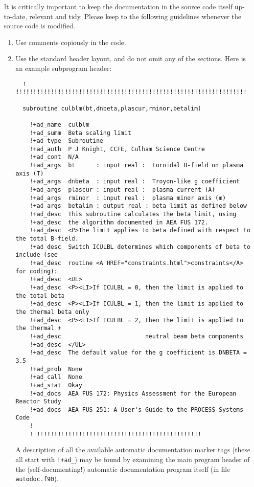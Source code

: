 \documentclass[11pt,a4paper]{report}
\begin{document}
It is critically important to keep the documentation in the source code itself
up-to-date, relevant and tidy. Please keep to the following guidelines
whenever the source code is modified.
\begin{enumerate}

\item Use comments copiously in the code.

\item Use the standard header layout, and do not omit any of the
  sections. Here is an example subprogram header:
\footnotesize
\begin{verbatim}
  ! !!!!!!!!!!!!!!!!!!!!!!!!!!!!!!!!!!!!!!!!!!!!!!!!!!!!!!!!!!!!!!!!!!

  subroutine culblm(bt,dnbeta,plascur,rminor,betalim)

    !+ad_name  culblm
    !+ad_summ  Beta scaling limit
    !+ad_type  Subroutine
    !+ad_auth  P J Knight, CCFE, Culham Science Centre
    !+ad_cont  N/A
    !+ad_args  bt      : input real :  toroidal B-field on plasma axis (T)
    !+ad_args  dnbeta  : input real :  Troyon-like g coefficient
    !+ad_args  plascur : input real :  plasma current (A)
    !+ad_args  rminor  : input real :  plasma minor axis (m)
    !+ad_args  betalim : output real : beta limit as defined below
    !+ad_desc  This subroutine calculates the beta limit, using
    !+ad_desc  the algorithm documented in AEA FUS 172.
    !+ad_desc  <P>The limit applies to beta defined with respect to the total B-field.
    !+ad_desc  Switch ICULBL determines which components of beta to include (see
    !+ad_desc  routine <A HREF="constraints.html">constraints</A> for coding):
    !+ad_desc  <UL>
    !+ad_desc  <P><LI>If ICULBL = 0, then the limit is applied to the total beta
    !+ad_desc  <P><LI>If ICULBL = 1, then the limit is applied to the thermal beta only
    !+ad_desc  <P><LI>If ICULBL = 2, then the limit is applied to the thermal +
    !+ad_desc                        neutral beam beta components
    !+ad_desc  </UL>
    !+ad_desc  The default value for the g coefficient is DNBETA = 3.5
    !+ad_prob  None
    !+ad_call  None
    !+ad_stat  Okay
    !+ad_docs  AEA FUS 172: Physics Assessment for the European Reactor Study
    !+ad_docs  AEA FUS 251: A User's Guide to the PROCESS Systems Code
    !
    ! !!!!!!!!!!!!!!!!!!!!!!!!!!!!!!!!!!!!!!!!!!!!!!!
\end{verbatim}
\normalsize
  A description of all the available automatic documentation marker tags
  (these all start with \verb.!+ad_.) may be found by examining the main
  program header of the (self-documenting!) automatic documentation program
  itself (in file \texttt{autodoc.f90}).


\end{enumerate}
\end{document}
